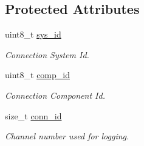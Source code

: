 \subsection*{Protected Attributes}
\begin{DoxyCompactItemize}
\item 
uint8\+\_\+t \mbox{\hyperlink{group__mavconn_ga2dc764873c9185f0399bf41fbadff32f}{sys\+\_\+id}}
\begin{DoxyCompactList}\small\item\em Connection System Id. \end{DoxyCompactList}\item 
uint8\+\_\+t \mbox{\hyperlink{group__mavconn_ga9f68651877ebc10d79f41925185d8553}{comp\+\_\+id}}
\begin{DoxyCompactList}\small\item\em Connection Component Id. \end{DoxyCompactList}\item 
size\+\_\+t \mbox{\hyperlink{group__mavconn_gab5e1164e0e16a986b4b8b07ac42149e5}{conn\+\_\+id}}
\begin{DoxyCompactList}\small\item\em Channel number used for logging. \end{DoxyCompactList}\end{DoxyCompactItemize}
